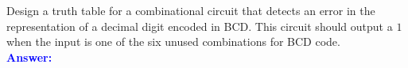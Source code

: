 \item{}
Design a truth table for a combinational circuit that detects an error in the
representation of a decimal digit encoded in BCD. This circuit should output
a $1$ when the input is one of the six unused combinations for BCD code.\\[12pt]
\ifanswers
\textcolor{blue}{
\textbf{Answer:}\\[12pt]
}
\newpage
\fi

